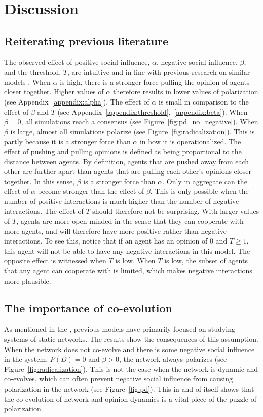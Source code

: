 \documentclass[11pt]{article}
\begin{document}
\section{Discussion}

\subsection{Reiterating previous literature}
The observed effect of positive social influence, $\alpha$, negative social influence, $\beta$, and the threshold, $T$, are intuitive and in line with previous research on similar models \cite{flache_models_2017}.  When $\alpha$ is high, there is a stronger force pulling the opinion of agents closer together. Higher values of $\alpha$ therefore results in lower values of polarization (see Appendix~\ref{appendix:alpha}). 
The effect of $\alpha$ is small in comparison to the effect of $\beta$ and $T$ (see Appendix~\ref{appendix:threshold},~\ref{appendix:beta}).
When $\beta = 0$, all simulations reach a consensus (see Figure~\ref{fig:pd_no_negative}). When $\beta$ is large, almost all simulations polarize (see Figure~\ref{fig:radicalization}). This is partly because it is a stronger force than $\alpha$ in how it is operationalized.  The effect of pushing and pulling opinions is defined as being proportional to the distance between agents. 
By definition, agents that are pushed away from each other are further apart than agents that are pulling each other's opinions closer together. In this sense, $\beta$ is a stronger force than $\alpha$. Only in aggregate can the effect of $\alpha$ become stronger than the effect of $\beta$. This is only possible when the number of positive interactions is much higher than the number of negative interactions. The effect of $T$ should therefore not be surprising. With larger values of $T$, agents are more open-minded in the sense that they can cooperate with more agents, and will therefore have more positive rather than negative interactions. To see this, notice that if an agent has an opinion of 0 and $T\geq1$, this agent will not be able to have any negative interactions in this model. The opposite effect is witnessed when $T$ is low. When $T$ is low, the subset of agents that any agent can cooperate with is limited, which makes negative interactions more plausible.
\subsection{The importance of co-evolution}
As mentioned in the \textit{}, previous models have primarily focused on studying systems of static networks.
The results show the consequences of this assumption. When the network does not co-evolve and there is some negative social influence in the system, $P(D) = 0$ and $\beta > 0$, the network always polarizes (see Figure~\ref{fig:radicalization}).
This is not the case when the network is dynamic and co-evolves, which can often prevent negative social influence from causing polarization in the network (see Figure~\ref{fig:pd}).
This in and of itself shows that the co-evolution of network and opinion dynamics is a vital piece of the puzzle of polarization. 
\end{document}
